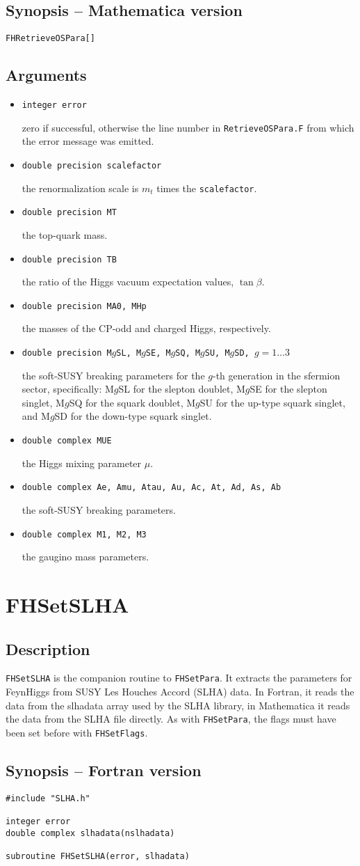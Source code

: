 \documentclass[12pt,a4paper]{report}
\newcommand{\CODE}[1]{\texttt{#1}}
\newcommand{\VAROUT}[1]{%
  \item[\fbox{\scriptsize\textsc{out}}]
  \CODE{#1}\par}
\newcommand{\ROUTINE}[1]{\pagebreak
  \section*{#1}%
  \addcontentsline{toc}{section}{#1}}
\newcommand{\DESCRIPTION}{\subsection*{Description}}
\newcommand{\FSYNOPSIS}{\subsection*{Synopsis -- Fortran version}}
\newcommand{\MSYNOPSIS}{\subsection*{Synopsis -- Mathematica version}}
\newcommand{\ARGUMENTS}{\subsection*{Arguments}\begin{itemize}}
\newcommand{\ENDARGUMENTS}{\end{itemize}}
\newcommand\uscore{\symbol{95}}
\begin{document}
\MSYNOPSIS

\begin{verbatim}
FHRetrieveOSPara[]
\end{verbatim}

\ARGUMENTS

\VAROUT{integer error}
zero if successful, otherwise the line number in \CODE{RetrieveOSPara.F}
from which the error message was emitted.

\VAROUT{double precision scalefactor}
the renormalization scale is $m_t$ times the \CODE{scalefactor}.

\VAROUT{double precision MT}
the top-quark mass.

\VAROUT{double precision TB}
the ratio of the Higgs vacuum expectation values, $\tan\beta$.

\VAROUT{double precision MA0, MHp}
the masses of the CP-odd and charged Higgs, respectively.

\VAROUT{double precision M$g$SL, M$g$SE, M$g$SQ, M$g$SU, M$g$SD, $g = 1\dots 3$}
the soft-SUSY breaking parameters for the $g$-th generation in the
sfermion sector, specifically: M$g$SL for the slepton doublet, M$g$SE
for the slepton singlet, M$g$SQ for the squark doublet, M$g$SU for the
up-type squark singlet, and M$g$SD for the down-type squark singlet.

\VAROUT{double complex MUE}
the Higgs mixing parameter $\mu$.

\VAROUT{double complex Ae, Amu, Atau, Au, Ac, At, Ad, As, Ab}
the soft-SUSY breaking parameters.

\VAROUT{double complex M\uscore 1, M\uscore 2, M\uscore 3}
the gaugino mass parameters.

\ENDARGUMENTS


\ROUTINE{FHSetSLHA}

\DESCRIPTION

\CODE{FHSetSLHA} is the companion routine to \CODE{FHSetPara}.  It
extracts the parameters for FeynHiggs from SUSY Les Houches Accord
(SLHA) data.  In Fortran, it reads the data from the slhadata array used
by the SLHA library, in Mathematica it reads the data from the SLHA file
directly.  As with \CODE{FHSetPara}, the flags must have been set
before with \CODE{FHSetFlags}.

\FSYNOPSIS

\begin{verbatim}
#include "SLHA.h"

integer error
double complex slhadata(nslhadata)

subroutine FHSetSLHA(error, slhadata)
\end{verbatim}
\end{document}
